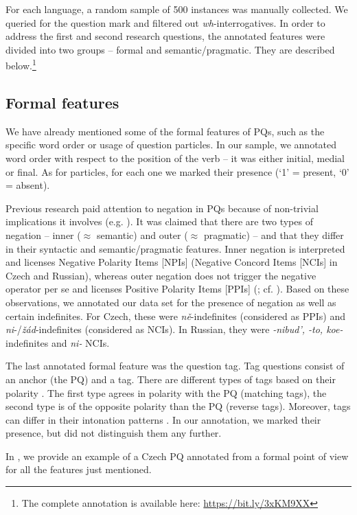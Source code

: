 \documentclass[output=paper,colorlinks,citecolor=brown]{langscibook}
\begin{document}
For each language, a random sample of 500 instances was manually collected. We queried for the question mark and filtered out \textit{wh}-interrogatives. In order to address the first and second research questions, the annotated features were divided into two groups -- formal and semantic/pragmatic. They are described below.\footnote{The complete annotation is available here: \url{https://bit.ly/3xKM9XX}}

\subsection{Formal features}
We have already mentioned some of the formal features of PQs, such as the specific word order or usage of question particles. In our sample, we annotated word order with respect to the position of the verb -- it was either initial, medial or final. As for particles, for each one we marked their presence (`1' = present, `0' = absent). 

Previous research paid attention to negation in PQs because of non-trivial implications it involves (e.g. \citealt{ono+:Ladd1981, ono+:Repp2013}). It was claimed that there are two types of negation -- inner ($\approx$ semantic) and outer ($\approx$ pragmatic) -- and that they differ in their syntactic and semantic/pragmatic features. Inner negation is interpreted and licenses Negative Polarity Items [NPIs] (Negative Concord Items [NCIs] in Czech and Russian), whereas outer negation does not trigger the negative operator per se and licenses Positive Polarity Items [PPIs] (\cite{Romero2004}; cf. \cite{Goodhue2022a}). Based on these observations, we annotated our data set for the presence of negation as well as certain indefinites. For Czech, these were \textit{ně}-indefinites (considered as PPIs) and \textit{ni}-/\textit{žád}-indefinites (considered as NCIs). In Russian, they were \textit{-nibud', -to, koe-} indefinites and \textit{ni-} NCIs.

The last annotated formal feature was the question tag. Tag questions consist of an anchor (the PQ) and a tag. There are different types of tags based on their polarity \citep[e.g.][]{krifka2015bias}. The first type agrees in polarity with the PQ (matching tags), the second type is of the opposite polarity than the PQ (reverse tags). Moreover, tags can differ in their intonation patterns \citep{ono+:Ladd1981}. In our annotation, we marked their presence, but did not distinguish them any further.

In , we provide an example of a Czech PQ annotated from a formal point of view for all the features just mentioned.
\end{document}
